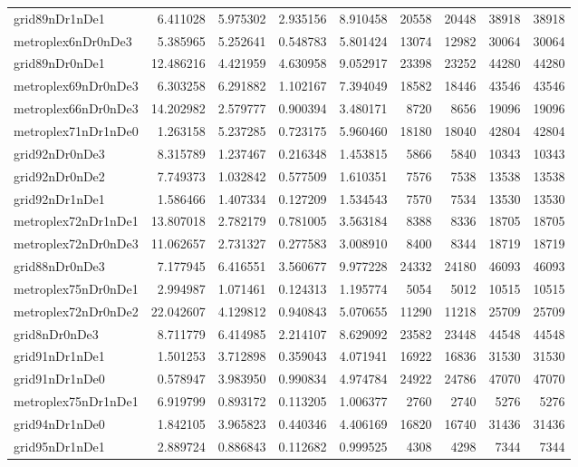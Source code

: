 \begin{longtable}{|l|r|r|r|r|r|r|r|r|}
grid89nDr1nDe1 & 6.411028 & 5.975302 & 2.935156 & 8.910458 & 20558 & 20448 & 38918 & 38918 \\
metroplex6nDr0nDe3 & 5.385965 & 5.252641 & 0.548783 & 5.801424 & 13074 & 12982 & 30064 & 30064 \\
grid89nDr0nDe1 & 12.486216 & 4.421959 & 4.630958 & 9.052917 & 23398 & 23252 & 44280 & 44280 \\
metroplex69nDr0nDe3 & 6.303258 & 6.291882 & 1.102167 & 7.394049 & 18582 & 18446 & 43546 & 43546 \\
metroplex66nDr0nDe3 & 14.202982 & 2.579777 & 0.900394 & 3.480171 & 8720 & 8656 & 19096 & 19096 \\
metroplex71nDr1nDe0 & 1.263158 & 5.237285 & 0.723175 & 5.960460 & 18180 & 18040 & 42804 & 42804 \\
grid92nDr0nDe3 & 8.315789 & 1.237467 & 0.216348 & 1.453815 & 5866 & 5840 & 10343 & 10343 \\
grid92nDr0nDe2 & 7.749373 & 1.032842 & 0.577509 & 1.610351 & 7576 & 7538 & 13538 & 13538 \\
grid92nDr1nDe1 & 1.586466 & 1.407334 & 0.127209 & 1.534543 & 7570 & 7534 & 13530 & 13530 \\
metroplex72nDr1nDe1 & 13.807018 & 2.782179 & 0.781005 & 3.563184 & 8388 & 8336 & 18705 & 18705 \\
metroplex72nDr0nDe3 & 11.062657 & 2.731327 & 0.277583 & 3.008910 & 8400 & 8344 & 18719 & 18719 \\
grid88nDr0nDe3 & 7.177945 & 6.416551 & 3.560677 & 9.977228 & 24332 & 24180 & 46093 & 46093 \\
metroplex75nDr0nDe1 & 2.994987 & 1.071461 & 0.124313 & 1.195774 & 5054 & 5012 & 10515 & 10515 \\
metroplex72nDr0nDe2 & 22.042607 & 4.129812 & 0.940843 & 5.070655 & 11290 & 11218 & 25709 & 25709 \\
grid8nDr0nDe3 & 8.711779 & 6.414985 & 2.214107 & 8.629092 & 23582 & 23448 & 44548 & 44548 \\
grid91nDr1nDe1 & 1.501253 & 3.712898 & 0.359043 & 4.071941 & 16922 & 16836 & 31530 & 31530 \\
grid91nDr1nDe0 & 0.578947 & 3.983950 & 0.990834 & 4.974784 & 24922 & 24786 & 47070 & 47070 \\
metroplex75nDr1nDe1 & 6.919799 & 0.893172 & 0.113205 & 1.006377 & 2760 & 2740 & 5276 & 5276 \\
grid94nDr1nDe0 & 1.842105 & 3.965823 & 0.440346 & 4.406169 & 16820 & 16740 & 31436 & 31436 \\
grid95nDr1nDe1 & 2.889724 & 0.886843 & 0.112682 & 0.999525 & 4308 & 4298 & 7344 & 7344 \\

\end{longtable}

